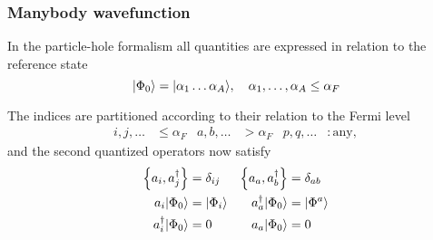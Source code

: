 \begin{frame}[fragile]
    \frametitle{Manybody wavefunction}
    In the particle-hole formalism all quantities are expressed in relation to the reference state
    \begin{equation*}
        |\Phi_0\rangle = |\alpha_1 \dots \alpha_A\rangle, \quad \alpha_1, \dots, \alpha_A \leq \alpha_F
    \end{equation*}
        
    The indices are partitioned according to their relation to the Fermi level
    \begin{align*}
        i,j,\ldots &\leq \alpha_F & a,b,\ldots &> \alpha_F & p,q, \ldots &: \textrm{any},
    \end{align*}
    and the second quantized operators now satisfy
    \begin{align*}
        \left\{a_i, a_j^\dagger \right\} &= \delta_{ij} &  \left\{a_a, a_b^\dagger \right\} &= \delta_{ab} \\
        a_i|\Phi_0\rangle &= |\Phi_i\rangle & a_a^\dagger|\Phi_0\rangle &= |\Phi^a\rangle \\
        a_i^\dagger|\Phi_0\rangle &= 0 & a_a|\Phi_0\rangle &= 0
    \end{align*}
            
\end{frame}
        
